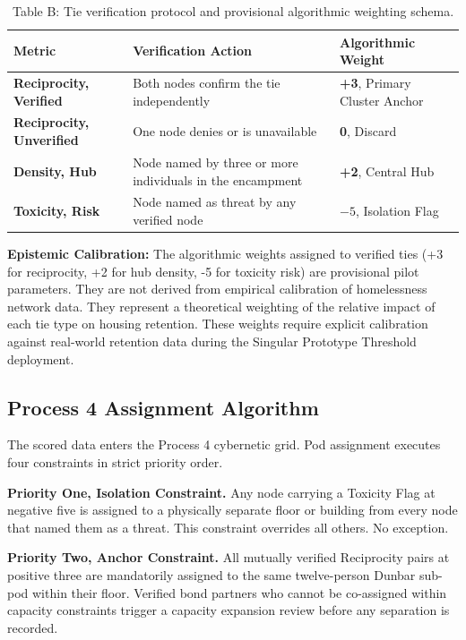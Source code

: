 \documentclass[12pt, letterpaper]{article}
\renewcommand{\arraystretch}{1.3}
\begin{document}
\begin{table}[H]
\renewcommand{\arraystretch}{1.2}
\begin{tabularx}{\textwidth}{@{} >{\raggedright\arraybackslash}p{3.5cm} >{\raggedright\arraybackslash}X >{\raggedright\arraybackslash}p{5.5cm} @{}}
\toprule
\textbf{Metric} & \textbf{Verification Action} & \textbf{Algorithmic Weight} \\
\midrule
\textbf{Reciprocity, Verified} & Both nodes confirm the tie independently & \textbf{+3}, Primary Cluster Anchor \\
\textbf{Reciprocity, Unverified} & One node denies or is unavailable & \textbf{0}, Discard \\
\textbf{Density, Hub} & Node named by three or more individuals in the encampment & \textbf{+2}, Central Hub \\
\textbf{Toxicity, Risk} & Node named as threat by any verified node & \textbf{$-5$}, Isolation Flag \\
\bottomrule
\end{tabularx}
\caption*{Table B: Tie verification protocol and provisional algorithmic weighting schema.}
\end{table}

\textbf{Epistemic Calibration:} The algorithmic weights assigned to verified ties (+3 for reciprocity, +2 for hub density, -5 for toxicity risk) are provisional pilot parameters. They are not derived from empirical calibration of homelessness network data. They represent a theoretical weighting of the relative impact of each tie type on housing retention. These weights require explicit calibration against real-world retention data during the Singular Prototype Threshold deployment.

\subsection{Process 4 Assignment Algorithm}

The scored data enters the Process 4 cybernetic grid. Pod assignment executes four constraints in strict priority order.

\textbf{Priority One, Isolation Constraint.} Any node carrying a Toxicity Flag at negative five is assigned to a physically separate floor or building from every node that named them as a threat. This constraint overrides all others. No exception.

\textbf{Priority Two, Anchor Constraint.} All mutually verified Reciprocity pairs at positive three are mandatorily assigned to the same twelve-person Dunbar sub-pod within their floor. Verified bond partners who cannot be co-assigned within capacity constraints trigger a capacity expansion review before any separation is recorded.
\end{document}
